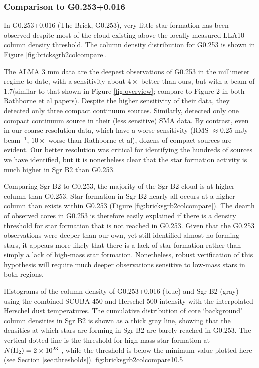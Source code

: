 \documentclass[twocolumn]{aastex61}
\begin{document}
\subsubsection{Comparison to G0.253+0.016}
In G0.253+0.016 (The Brick, G0.253), very little star formation
has been observed
\citep{Longmore2013a,Johnston2014a,Rathborne2014a,Rathborne2015a} despite most
of the cloud existing above the locally measured LLA10 column
density threshold.  The column density distribution for G0.253
is shown in Figure \ref{fig:bricksgrb2colcompare}.

The \citet{Rathborne2014a,Rathborne2015a} ALMA 3 mm data are the
deepest observations of G0.253 in the millimeter regime to date, with a
sensitivity about $4\times$ better than ours, but with a beam of 1.7\arcsec (similar
to that shown in Figure \ref{fig:overview}; compare to Figure 2 in both
Rathborne et al papers).  Despite the higher sensitivity of their data,
they detected only three compact continuum sources.  Similarly,
\citet{Kauffmann2013a} detected only one compact continuum source in their
(less sensitive) SMA data.  By contrast, even in our coarse resolution data, which
have a worse sensitivity (RMS $\approx 0.25$ mJy beam$^{-1}$, $10\times$ worse
than Rathborne et al), dozens of compact sources are evident.  Our better
resolution was critical for identifying the hundreds of sources we have
identified, but it is nonetheless clear that the star formation activity is
much higher in Sgr B2 than G0.253.


Comparing Sgr B2 to G0.253, the majority of the Sgr B2 cloud is at higher
column than G0.253.  Star formation in Sgr B2 nearly all occurs
at a higher column than exists within G0.253 (Figure
\ref{fig:bricksgrb2colcompare}).  The dearth of observed cores in G0.253 is
therefore easily explained if there is a density threshold for star
formation that is not reached in G0.253.  Given that the G0.253 observations
were deeper than our own, yet still identified almost no forming stars, it
appears more likely that there is a lack of star formation rather than simply a
lack of high-mass star formation.  Nonetheless, robust verification of this
hypothesis will require much deeper observations sensitive to low-mass stars
in both regions.

{Histograms of the column density of G0.253+0.016 (blue) and Sgr B2 (gray)
using the combined SCUBA 450 \um and Herschel 500 \um intensity with the
interpolated Herschel dust temperatures.  The cumulative distribution of core
`background' column densities in Sgr B2 is shown as a thick gray line, showing
that the densities at which stars are forming in Sgr B2 are barely
reached in G0.253.  The vertical dotted line is the \citet{Krumholz2008a}
threshold for high-mass star formation at $N(\textrm{H}_{2})=2\times10^{23}$ \persc, while
the \citet{Lada2010a} threshold is below the minimum value plotted here (see
Section \ref{sec:thresholds}).}
{fig:bricksgrb2colcompare}{1}{0.5\textwidth}
\end{document}
